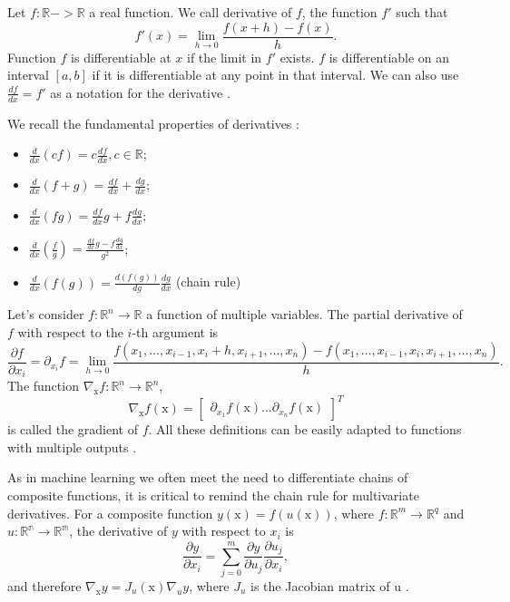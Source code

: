 \par Let $f:\mathbb{R}->\mathbb{R}$ a real function. We call derivative of $f$, the function $f'$ such that
$$f'(x) =\lim_{h\rightarrow 0}\frac{f(x+h)-f(x)}{h}.$$
Function $f$ is differentiable at $x$ if the limit in $f'$ exists. $f$ is differentiable on an interval $[a,b]$ if it is differentiable at any point in that interval. We can also use $\frac{df}{dx} = f'$ as a notation for the derivative \cite{D2l}.

\par We recall the fundamental properties of derivatives \cite{D2l}:
\begin{itemize}
\item $\frac{d}{dx}(cf) = c\frac{df}{dx}, c\in\mathbb{R}$;
\item $\frac{d}{dx}(f+g) = \frac{df}{dx} + \frac{dg}{dx}$;
\item $\frac{d}{dx}(fg) = \frac{df}{dx}g + f\frac{dg}{dx}$;
\item $\frac{d}{dx}(\frac{f}{g}) = \frac{\frac{df}{dx}g - f\frac{dg}{dx}}{g^2}$;
\item $\frac{d}{dx}(f(g)) = \frac{d(f(g))}{dg}\frac{dg}{dx}$ (chain rule)
\end{itemize}


\par Let's consider $f:\mathbb{R}^n\rightarrow \mathbb{R}$ a function of multiple variables. The partial derivative of $f$ with respect to the $i$-th argument is
$$\frac{\partial f}{\partial x_i} = \partial_{x_i}f = \lim_{h \rightarrow 0} \frac{f(x_1, \ldots,x_{i-1},x_i+h,x_{i+1},\ldots,x_n)-f(x_1, \ldots,x_{i-1},x_i,x_{i+1},\ldots,x_n)}{h}.$$ The function $\nabla_{\mathrm{x}}f:\mathbb{R}^n\rightarrow\mathbb{R}^n$,
$$\nabla_{\mathrm{x}}f(\mathrm{x}) = \begin{bmatrix} \partial_{x_1}f(\mathrm{x}) \ldots \partial_{x_n}f(\mathrm{x}) \end{bmatrix}^T $$
is called the gradient of $f$. All these definitions can be easily adapted to functions with multiple outputs \cite{D2l}.

\par As in machine learning we often meet the need to differentiate chains of composite functions, it is critical to remind the chain rule for multivariate derivatives. For a composite function $y(\mathrm{x})=f(u(\mathrm{x}))$, where $f:\mathbb{R}^m\rightarrow \mathbb{R}^q$ and $u:\mathbb{R^n}\rightarrow\mathbb{R^m}$, the derivative of $y$ with respect to $x_i$ is
$$\frac{\partial y}{\partial x_i} = \sum_{j=0}^m \frac{\partial y}{\partial u_j} \frac{\partial u_j}{\partial x_i}, $$
and therefore $\nabla_\mathrm{x}y = J_u(\mathrm{x}) \nabla_u{y}$, where $J_u$ is the Jacobian matrix of $\mathrm{u}$ \cite{D2l} \cite{damadi2023backpropagation}.

